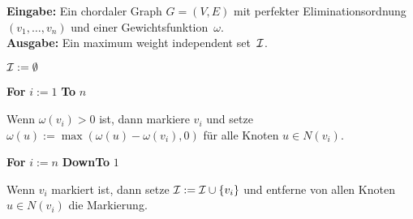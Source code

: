 \begin{Algorithm}\label{algo:mwis}
    \textbf{Eingabe:} Ein chordaler Graph $G=(V,E)$ mit perfekter Eliminationsordnung $(v_1,\ldots,v_n)$ und einer Gewichtsfunktion~$\omega$.\\
    \textbf{Ausgabe:} Ein maximum weight independent set~$\mathcal{I}$.\\

    \begin{codeLine}
        \item  $\mathcal{I} := \emptyset$
        \item \textbf{For} $i:= 1$ \textbf{To} $n$
              \begin{innerCodeLine}
                  \item[] Wenn $\omega(v_i)>0$ ist, dann markiere $v_i$ und setze $\omega(u) := \max(\omega(u) - \omega(v_i),0)$ für alle Knoten $u \in N(v_i)$.
              \end{innerCodeLine}
              
        \item \textbf{For} $i:= n$ \textbf{DownTo} $1$
              \begin{innerCodeLine}
                  \item[] Wenn $v_i$ markiert ist, dann setze $\mathcal{I} := \mathcal{I} \cup \{v_i\}$ und entferne von allen Knoten $u \in N(v_i)$ die Markierung.
              \end{innerCodeLine}
    \end{codeLine}
\end{Algorithm}

